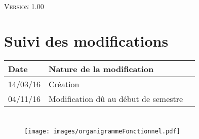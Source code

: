 \documentclass[asi, sansVersion]{picInsa}
\begin{document}
	\begin{center}
		\LARGE
		\textsc{
			\OF{}\\
			Version 1.00
		}
	\end{center}
	\vspace{0.5cm}

	\section*{Suivi des modifications}
		\begin{table}[H]
			\centering
			\begin{tabularx}{18cm}{|p{1.7cm}|X|p{4cm}|}
				\hline
				\rowcolor[gray]{0.90} Date & Nature de la modification \\
				\hline
				
				14/03/16 & Création \\
				04/11/16 & Modification dû au début de semestre \\
				\hline
			\end{tabularx}
		\end{table}

	\section*{\OF}
		\begin{figure}[h]
				\texttt{[image: images/organigrammeFonctionnel.pdf]}
		\end{figure}
\end{document}
